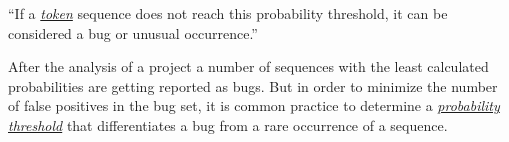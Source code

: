 \begin{definition}\label{def:probability_threshold}
    ``If a \hyperref[def:token]{\textit{token}} sequence does not reach this probability threshold, it can be considered a bug or unusual occurrence.''
\end{definition}

After the analysis of a project a number of sequences with the least calculated probabilities are getting reported as bugs. But in order to minimize the number of false positives in the bug set, it is common practice to determine a \hyperref[def:probability_threshold]{\textit{probability threshold}} that differentiates a bug from a rare occurrence of a sequence. 